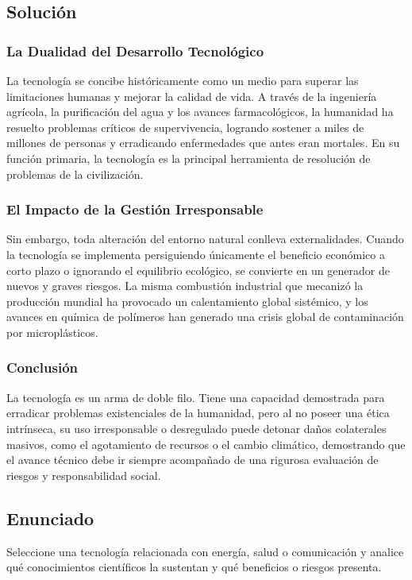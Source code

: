 \documentclass[12pt, a4paper]{article}
\begin{document}
\subsection*{Solución}

\subsubsection*{La Dualidad del Desarrollo Tecnológico}
La tecnología se concibe históricamente como un medio para superar las limitaciones humanas y mejorar la calidad de vida. A través de la ingeniería agrícola, la purificación del agua y los avances farmacológicos, la humanidad ha resuelto problemas críticos de supervivencia, logrando sostener a miles de millones de personas y erradicando enfermedades que antes eran mortales. En su función primaria, la tecnología es la principal herramienta de resolución de problemas de la civilización.

\subsubsection*{El Impacto de la Gestión Irresponsable}
Sin embargo, toda alteración del entorno natural conlleva externalidades. Cuando la tecnología se implementa persiguiendo únicamente el beneficio económico a corto plazo o ignorando el equilibrio ecológico, se convierte en un generador de nuevos y graves riesgos. La misma combustión industrial que mecanizó la producción mundial ha provocado un calentamiento global sistémico, y los avances en química de polímeros han generado una crisis global de contaminación por microplásticos.

\subsubsection*{Conclusión}
La tecnología es un arma de doble filo. Tiene una capacidad demostrada para erradicar problemas existenciales de la humanidad, pero al no poseer una ética intrínseca, su uso irresponsable o desregulado puede detonar daños colaterales masivos, como el agotamiento de recursos o el cambio climático, demostrando que el avance técnico debe ir siempre acompañado de una rigurosa evaluación de riesgos y responsabilidad social.

\newpage

\subsection*{Enunciado}
Seleccione una tecnología relacionada con energía, salud o comunicación y analice qué conocimientos científicos la sustentan y qué beneficios o riesgos presenta.
\end{document}
